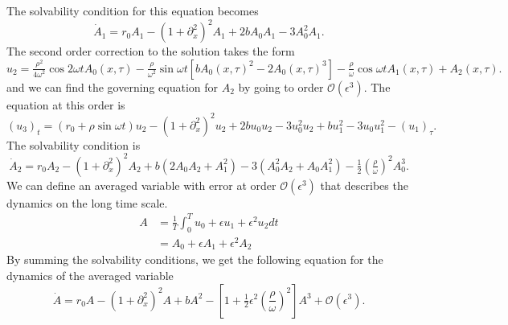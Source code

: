 \documentclass[pre,preprint,superscriptaddress]{revtex4-1}
\begin{document}
The solvability condition for this equation becomes
\begin{equation}
\dot{A}_1 = r_0 A_1-\left(1+\partial_{x}^2\right)^2A_1+2 b A_0A_1-3A_0^2A_1\label{eq:SH}.
\end{equation}
The second order correction to the solution takes the form
\begin{equation}
u_2=  \tfrac{\rho^2}{4\omega^2} \cos2\omega t A_0(x,\tau) -\tfrac{\rho}{\omega^2} \sin\omega t \left[b A_0(x,\tau)^2-2 A_0(x,\tau)^3\right] -\tfrac{\rho}{\omega} \cos \omega t A_1(x,\tau)  + A_2(x,\tau)\label{eq:SH}.
\end{equation}
and we can find the governing equation for $A_2$ by going to order $\mathcal{O}(\epsilon^3)$.  The equation at this order is
\begin{equation}
(u_3)_t= (r_0+ \rho \sin\omega t) u_2-\left(1+\partial_{x}^2\right)^2 u_2+ 2 b u_0 u_2- 3 u_0^2 u_2 +b u_1^2-3u_0 u_1^2  -(u_1)_{\tau}\label{eq:SH}.
\end{equation}
The solvability condition is
\begin{equation}
\dot{A}_2= r_0 A_2-\left(1+\partial_{x}^2\right)^2A_2+b (2 A_0A_2+A_1^2) - 3( A_0^2A_2+A_0A_1^2)
		-\tfrac{1}{2}\left(\tfrac{\rho}{\omega}\right)^2 A_0^3  \label{eq:SH}.
\end{equation}
We can define an averaged  variable with error at order $\mathcal{O}(\epsilon^3)$ that describes the dynamics on the long time scale.  
\begin{align}
A &=\frac{1}{T}\int_0^T u_0+\epsilon u_1 +\epsilon^2 u_2 dt \\ \nonumber
	&=A_0+\epsilon A_1 +\epsilon^2 A_2
\end{align}
By summing the solvability conditions, we get the following equation for the dynamics of the averaged variable
\begin{equation}
\dot{A}= r_0 A-\left(1+\partial_{x}^2\right)^2A+b A^2-\left[1+\tfrac{1}{2}\epsilon^2\left(\frac{\rho}{\omega}\right)^2\right]A^3 +\mathcal{O}(\epsilon^3)\label{eq:SH}.
\end{equation}
\end{document}
